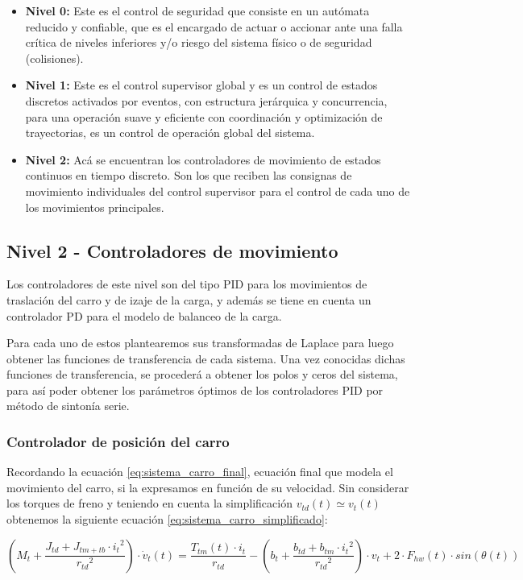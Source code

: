 \documentclass[11pt]{article}
\begin{document}
\begin{itemize}
	\item \textbf{Nivel 0:} Este es el control de seguridad que consiste en un autómata reducido y confiable, que es el encargado de actuar o accionar ante una falla crítica de niveles inferiores y/o riesgo del sistema físico o de seguridad (colisiones).
	\item \textbf{Nivel 1:} Este es el control supervisor global y es un control de estados discretos activados por eventos, con estructura jerárquica y concurrencia, para una operación suave y eficiente con coordinación y optimización de trayectorias, es un control de operación global del sistema.
	\item \textbf{Nivel 2:} Acá se encuentran los controladores de movimiento de estados continuos en tiempo discreto. Son los que reciben las consignas de movimiento individuales del control supervisor para el control de cada uno de los movimientos principales.
\end{itemize}

\subsection{Nivel 2 - Controladores de movimiento}
Los controladores de este nivel son del tipo PID para los movimientos de traslación del carro y de izaje de la carga, y además se tiene en cuenta un controlador PD para el modelo de balanceo de la carga.

Para cada uno de estos plantearemos sus transformadas de Laplace para luego obtener las funciones de transferencia de cada sistema. Una vez conocidas dichas funciones de transferencia, se procederá a obtener los polos y ceros del sistema, para así poder obtener los parámetros óptimos de los controladores PID por método de sintonía serie.

\newpage

\subsubsection{Controlador de posición del carro}
Recordando la ecuación \ref{eq:sistema_carro_final}, ecuación final que modela el movimiento del carro, si la expresamos en función de su velocidad. Sin considerar los torques de freno y teniendo en cuenta la simplificación $v_{td}(t)\simeq v_{t}(t)$ obtenemos la siguiente ecuación \ref{eq:sistema_carro_simplificado}:

\begin{equation}
	\label{eq:sistema_carro_simplificado}
	\left ( M_{t}+ \frac{J_{td}+J_{tm+tb}\cdot{i_{t}}^{2}}{{r_{td}}^{2}} \right )\cdot\dot{v}_{t}(t)=\frac{T_{tm}(t)\cdot i_{t}}{r_{td}}-\left (b_{t} +\frac{b_{td}+b_{tm}\cdot{i_{t}}^{2}}{{r_{td}}^{2}} \right )\cdot v_{t} + 2\cdot F_{hw}(t) \cdot sin \left ( \theta(t) \right )
\end{equation}
\end{document}
